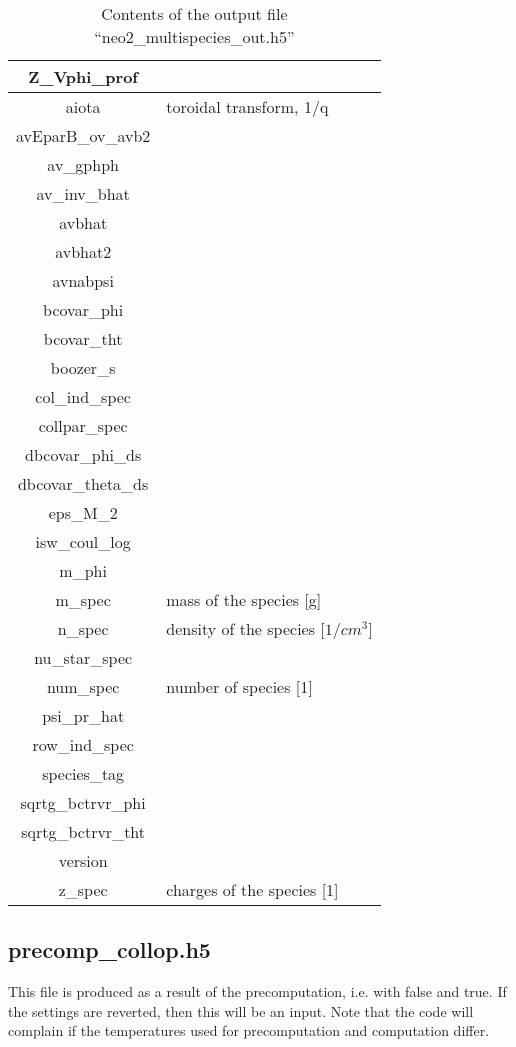 \begin{table}[h]
\begin{tabular}{|c|l|}
\hline
Z\_Vphi\_prof & \\
\hline
aiota & toroidal transform, 1/q \\
\hline
avEparB\_ov\_avb2 & \\
\hline
av\_gphph & \\
\hline
av\_inv\_bhat & \\
\hline
avbhat & \\
\hline
avbhat2 & \\
\hline
avnabpsi & \\
\hline
bcovar\_phi & \\
\hline
bcovar\_tht & \\
\hline
boozer\_s & \\
\hline
col\_ind\_spec & \\
\hline
collpar\_spec & \\
\hline
dbcovar\_phi\_ds & \\
\hline
dbcovar\_theta\_ds & \\
\hline
eps\_M\_2 & \\
\hline
isw\_coul\_log & \\
\hline
m\_phi & \\
\hline
m\_spec & mass of the species [g] \\
\hline
n\_spec & density of the species [$1/cm^3$] \\
\hline
nu\_star\_spec & \\
\hline
num\_spec & number of species [1] \\
\hline
psi\_pr\_hat & \\
\hline
row\_ind\_spec & \\
\hline
species\_tag & \\
\hline
sqrtg\_bctrvr\_phi & \\
\hline
sqrtg\_bctrvr\_tht & \\
\hline
version & \\
\hline
z\_spec & charges of the species [1]

\end{tabular}
\caption{Contents of the output file ``neo2\_multispecies\_out.h5''}
\end{table}


\subsection{precomp\_collop.h5}
This file is produced as a result of the precomputation, i.e. with
 false and
 true. If the settings are
reverted, then this will be an input.
Note that the code will complain if the temperatures used for
precomputation and computation differ.

